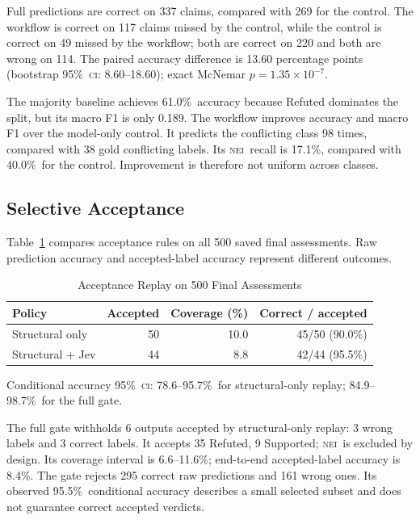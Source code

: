 \documentclass[conference]{IEEEtran}
\newcommand{\NEI}{\textsc{nei}}
\newcommand{\CI}{\textsc{ci}}
\newcommand{\pct}{\%}
\begin{document}
Full predictions are correct on 337 claims, compared with 269 for the control. The workflow is correct on 117 claims missed by the control, while the control is correct on 49 missed by the workflow; both are correct on 220 and both are wrong on 114. The paired accuracy difference is 13.60 percentage points (bootstrap 95\pct\ \CI: 8.60--18.60); exact McNemar \(p=1.35\times 10^{-7}\).

The majority baseline achieves 61.0\pct\ accuracy because Refuted dominates the split, but its macro F1 is only 0.189. The workflow improves accuracy and macro F1 over the model-only control. It predicts the conflicting class 98 times, compared with 38 gold conflicting labels. Its \NEI\ recall is 17.1\pct, compared with 40.0\pct\ for the control. Improvement is therefore not uniform across classes.

\subsection{Selective Acceptance}
Table~\ref{tab:acceptance} compares acceptance rules on all 500 saved final assessments. Raw prediction accuracy and accepted-label accuracy represent different outcomes.

\begin{table}[t]
\caption{Acceptance Replay on 500 Final Assessments}
\label{tab:acceptance}
\centering
\footnotesize
\begin{tabular}{@{}lrrr@{}}
\toprule
Policy & Accepted & Coverage (\pct) & Correct / accepted\\
\midrule
Structural only & 50 & 10.0 & 45/50 (90.0\pct)\\
Structural + Jev & 44 & 8.8 & 42/44 (95.5\pct)\\
\bottomrule
\end{tabular}
\par\smallskip
\parbox{\columnwidth}{\footnotesize Conditional accuracy 95\pct\ \CI: 78.6--95.7\pct\ for structural-only replay; 84.9--98.7\pct\ for the full gate.}
\end{table}

The full gate withholds 6 outputs accepted by structural-only replay: 3 wrong labels and 3 correct labels. It accepts 35 Refuted, 9 Supported; \NEI\ is excluded by design. Its coverage interval is 6.6--11.6\pct; end-to-end accepted-label accuracy is 8.4\pct. The gate rejects 295 correct raw predictions and 161 wrong ones. Its observed 95.5\pct\ conditional accuracy describes a small selected subset and does not guarantee correct accepted verdicts.
\end{document}
